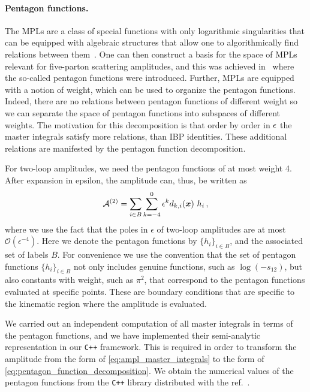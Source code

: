 \paragraph{Pentagon functions.}
The MPLs are a class of special functions with 
only logarithmic singularities that can be equipped with algebraic
structures that allow one to algorithmically find relations between
them~\cite{Goncharov:2010jf,Duhr:2011zq,Duhr:2012fh}. One can then
construct a basis for the space of MPLs relevant for five-parton
scattering amplitudes, and this was achieved in~\cite{Gehrmann:2018yef}
where the so-called pentagon functions were introduced.
Further, MPLs are equipped with a notion of weight, which can
be used to organize the pentagon functions. Indeed, there are
no relations between pentagon functions of different weight so we can
separate the space of pentagon functions into subspaces of different 
weights. 
The motivation for this decomposition is
that order by order in $\epsilon$ the master integrals satisfy more relations, than IBP identities. These additional relations are manifested by the pentagon
function decomposition.

For two-loop amplitudes, we need the pentagon functions of at most weight 4.
After expansion in epsilon, the amplitude can, thus, be written as
\begin{equation} \label{eq:pentagon_function_decomposition}
  \mathcal{A}^{(2)}=
    \sum_{i\in B}\sum_{k=-4}^0\epsilon^{k}
    d_{k,i}(\vb*{x})~h_i\,,
\end{equation}
where we use the fact that the poles in $\epsilon$ of two-loop amplitudes are at most $\mathcal{O}(\epsilon^{-4})$.
Here we denote the pentagon functions by $\{h_i\}_{i\in B}$, and the associated set of labels $B$. 
For convenience we use the convention that the set of pentagon functions $\{h_i\}_{i\in B}$
not only includes genuine functions, such as $\log(-s_{12})$, but also
constants with weight, such as $\pi^2$, that correspond to the pentagon 
functions evaluated at specific points. These are boundary conditions that
are specific to the kinematic region where the amplitude is evaluated.

We carried out an independent computation of all master integrals in terms of the pentagon functions, and
we have implemented their semi-analytic representation in our \texttt{C++} framework. This is required  in order to 
transform the amplitude from the form of \cref{eq:ampl_master_integrals} to the form of \cref{eq:pentagon_function_decomposition}.
We obtain the numerical values of the pentagon functions from the \texttt{C++} library distributed with the ref.\ \cite{Gehrmann:2018yef}.

